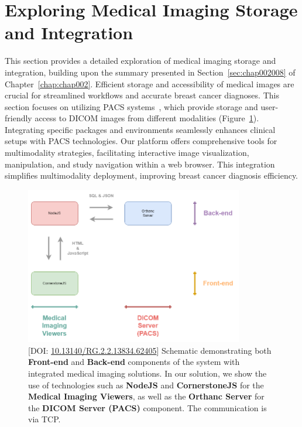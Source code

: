 \section{Exploring Medical Imaging Storage and Integration}
\label{sec:app001008}

This section provides a detailed exploration of medical imaging storage and integration, building upon the summary presented in Section~\ref{sec:chap002008} of Chapter~\ref{chap:chap002}.
Efficient storage and accessibility of medical images are crucial for streamlined workflows and accurate breast cancer diagnoses.
This section focuses on utilizing \ac{PACS} systems~\cite{carter2018digital}, which provide storage and user-friendly access to \ac{DICOM} images from different modalities (Figure~\ref{fig:fig113}).
Integrating specific packages and environments seamlessly enhances clinical setups with \ac{PACS} technologies.
Our platform offers comprehensive tools for multimodality strategies, facilitating interactive image visualization, manipulation, and study navigation within a web browser.
This integration simplifies multimodality deployment, improving breast cancer diagnosis efficiency.

\begin{figure}[ht]
\centering
\includegraphics[width=0.85\textwidth]{images/fig113}
\caption{[DOI: \href{https://doi.org/10.13140/rg.2.2.13834.62405}{10.13140/RG.2.2.13834.62405}] Schematic demonstrating both {\bf Front-end} and {\bf Back-end} components of the system with integrated medical imaging solutions. In our solution, we show the use of technologies such as {\bf NodeJS} and {\bf CornerstoneJS} for the {\bf Medical Imaging Viewers}, as well as the {\bf Orthanc Server} for the {\bf DICOM Server (PACS)} component. The communication is via TCP.}
\label{fig:fig113}
\end{figure}


